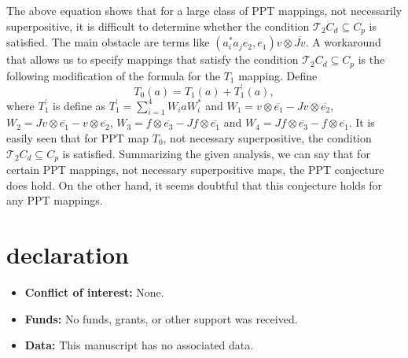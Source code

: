 \documentclass{amsart}
\theoremstyle{plain}
\theoremstyle{definition}
\newcommand{\cT}{\mathcal{T}}
\begin{document}
The above equation shows that for a large class of PPT mappings, not necessarily superpositive, it is difficult to determine whether the condition 
$\cT_2 C_d \subseteq C_p$ is satisfied. The main obstacle are terms like $(a^*_ia_je_2,e_1) v\otimes \overline{Jv}$. A workaround that allows us to specify mappings that satisfy the condition $\cT_2 C_d \subseteq C_p$ is the following modification of the formula for the $T_1$ mapping.
Define
\begin{equation}
T_0(a) = T_1(a) + T^{\prime}_1(a),
\end{equation}
where $T^{\prime}_1$ is define as $T^{\prime}_1 = \sum_{i=1}^4 W_i a W^*_i$ and
$W_1= v \otimes \overline{e_1} - Jv \otimes \overline{e_2}$,  $W_2= Jv \otimes \overline{e_1} - v \otimes \overline{e_2}$,
$W_3 = f \otimes \overline{e_3} - Jf \otimes \overline{e_1}$ and
$W_4= Jf \otimes \overline{e_3} - f \otimes \overline{e_1}$.
It is easily seen that for PPT map $T_0$, not necessary superpositive, the condition $\cT_2 C_d \subseteq C_p$ is satisfied.
Summarizing the given analysis, we can say that for certain PPT mappings, not necessary superpositive maps, the PPT conjecture does  hold. On the other hand, it seems doubtful that this conjecture holds for any PPT mappings.










\section{declaration}

\begin{itemize}
\item \textbf{Conflict of interest:} None.
\item \textbf{Funds:} No funds, grants, or other support was received.
\item \textbf{Data:} This manuscript has no associated data.

\end{itemize}
\end{document}
